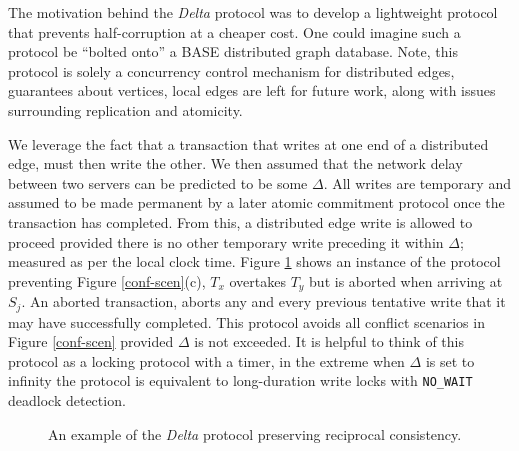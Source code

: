 \documentclass[sigplan,10pt]{acmart}
\begin{document}
The motivation behind the \emph{Delta} protocol was to develop a lightweight protocol that prevents half-corruption at a cheaper cost. One could imagine such a protocol be ``bolted onto'' a BASE distributed graph database. Note, this protocol is solely a concurrency control mechanism for distributed edges, guarantees about vertices, local edges are left for future work, along with issues surrounding replication and atomicity.

We leverage the fact that a transaction that writes at one end of a distributed edge, must then write the other. We then assumed that the network delay between two servers can be predicted to be some $\Delta$. All writes are temporary and assumed to be made permanent by a later atomic commitment protocol once the transaction has completed. From this, a distributed edge write is allowed to proceed provided there is no other temporary write preceding it within $\Delta$; measured as per the local clock time. Figure \ref{delta-abort} shows an instance of the protocol preventing Figure \ref{conf-scen}(c), $T_x$ overtakes $T_y$ but is aborted when arriving at $S_j$. An aborted transaction, aborts any and every previous tentative write that it may have successfully completed. This protocol avoids all conflict scenarios in Figure \ref{conf-scen} provided $\Delta$ is not exceeded. It is helpful to think of this protocol as a locking protocol with a timer, in the extreme when $\Delta$ is set to infinity the protocol is equivalent to long-duration write locks with \texttt{NO_WAIT} deadlock detection.

\begin{figure}[H]
  \centering
  \caption{An example of the \emph{Delta} protocol preserving reciprocal consistency.}
  \label{delta-abort}
\end{figure}
\end{document}
